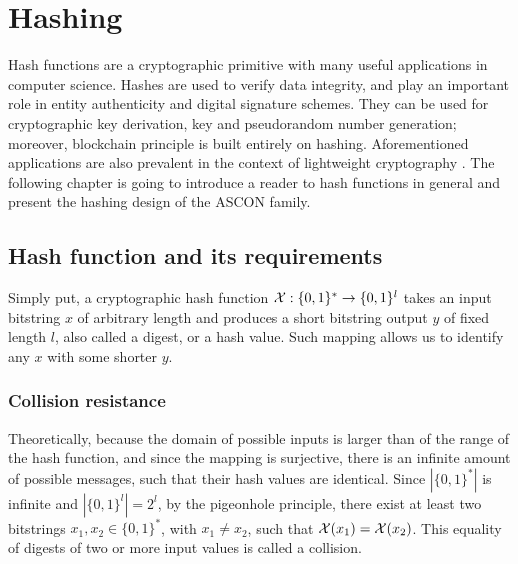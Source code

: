 

\section{Hashing}
Hash functions are a cryptographic primitive with many useful applications in computer science. Hashes are used to verify data integrity, and play an important role in entity authenticity and digital signature schemes. They can be used for cryptographic key derivation, key and pseudorandom number generation; moreover, blockchain principle is built entirely on hashing. Aforementioned applications are also prevalent in the context of lightweight cryptography \cite{lightHashTrends}. The following chapter is going to introduce a reader to hash functions in general and present the hashing design of the ASCON family.

\subsection{Hash function and its requirements}
Simply put, a cryptographic hash function $ \mathcal{X}: \{0, 1\}^* \rightarrow \{0,1\}^{l} $ takes an input bitstring $x$ of arbitrary length and produces a short bitstring output $y$ of fixed length $l$, also called a digest, or a hash value. Such mapping allows us to identify any $x$ with some shorter $y$. 

\subsubsection{Collision resistance}
Theoretically, because the domain of possible inputs is larger than of the range of the hash function, and since the mapping is surjective, there is an infinite amount of possible messages, such that their hash values are identical. Since $ |\{0,1\}^*| $ is infinite and $ |\{0,1\}^l| = 2^l $, by the pigeonhole principle, there exist at least two bitstrings $ x_1, x_2 \in \{0,1\}^* $, with $ x_1 \neq x_2 $, such that $ \mathcal{X}(x_1) = \mathcal{X}(x_2) $. This equality of digests of two or more input values is called a collision.

